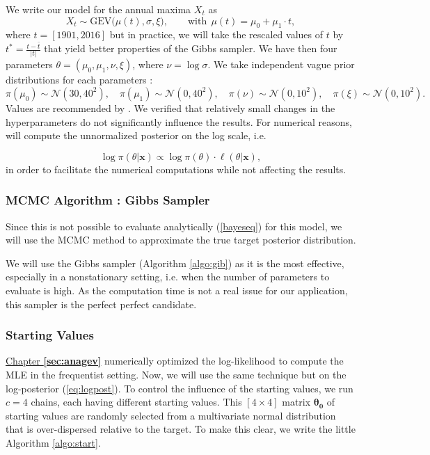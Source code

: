 We write our model for the annual maxima $X_t$ as  
\begin{equation*}
X_{t}\sim \text{GEV}\big(\mu(t), \sigma, \xi\big), \qquad \text{with} \ \ \mu(t)= \mu_0+\mu_1\cdot t,
\end{equation*}
where $t=[1901,2016]$ but in practice, we will take the rescaled values of $t$ by $t^{*} = \frac{t - \bar{t} }{|t|}$ that yield better properties of the  Gibbs sampler. 
We have then four parameters $\theta=(\mu_0,\mu_1,\nu,\xi)$, where $\nu=\log\sigma$. We take independent vague prior distributions for each parameters :
\begin{equation*}
\pi(\mu_0)\sim\mathcal{N}(30,40^2),\quad \pi(\mu_1)\sim\mathcal{N}(0,40^2),\quad \pi(\nu)\sim\mathcal{N}(0,10^2),\quad
\pi(\xi)\sim\mathcal{N}(0,10^2).
\end{equation*}
Values are recommended by \citet[chap.13]{dey_extreme_2016}. We verified that relatively small changes in the hyperparameters do not significantly influence the results.
For numerical reasons, will compute the unnormalized posterior on the log scale, i.e.

\begin{equation}\label{eq:logpost}
\log\pi(\theta|\boldsymbol{x})\propto \log\pi(\theta)\cdot \ell(\theta|\boldsymbol{x}),
\end{equation}
in order to facilitate the numerical computations while not affecting the results.


\subsubsection*{MCMC Algorithm : Gibbs Sampler}

Since this is not possible to evaluate analytically (\ref{bayeseq}) for this model, we will use the MCMC method to approximate the true target posterior distribution. 

We will use the Gibbs sampler (Algorithm \ref{algo:gib}) as it is the most effective, especially in a nonstationary setting, i.e. when the number of parameters to evaluate is high. As the computation time is not a real issue for our application, this sampler is the perfect perfect candidate.



\subsubsection*{Starting Values}

\hyperref[sec:anagev]{Chapter \textbf{\ref{sec:anagev}}} numerically optimized the log-likelihood to compute the MLE in the frequentist setting. Now, we will use the same technique but on the log-posterior (\ref{eq:logpost}).
To control the influence of the starting values, we run $c=4$ chains, each having different starting values. This $[4\times 4]$ matrix $\boldsymbol{\theta_0}$ of starting values are randomly selected from a multivariate normal distribution that is over-dispersed relative to the target. To make this clear, we write the little Algorithm \ref{algo:start}.

